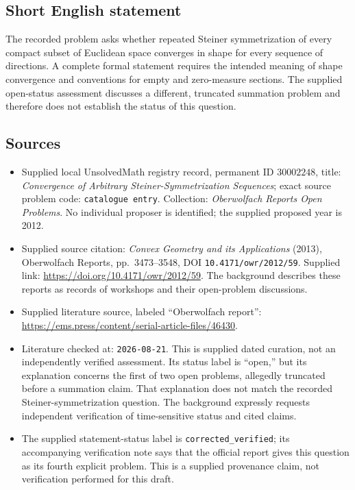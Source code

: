 \documentclass[11pt]{article}
\begin{document}
\subsection{Short English statement}
The recorded problem asks whether repeated Steiner symmetrization of every compact subset of Euclidean space converges in shape for every sequence of directions. A complete formal statement requires the intended meaning of shape convergence and conventions for empty and zero-measure sections. The supplied open-status assessment discusses a different, truncated summation problem and therefore does not establish the status of this question.
\subsection{Sources}
\begin{itemize}
\item Supplied local UnsolvedMath registry record, permanent ID \(30002248\), title: \emph{Convergence of Arbitrary Steiner-Symmetrization Sequences}; exact source problem code: \texttt{catalogue entry}. Collection: \emph{Oberwolfach Reports Open Problems}. No individual proposer is identified; the supplied proposed year is 2012.
\item Supplied source citation: \emph{Convex Geometry and its Applications} (2013), Oberwolfach Reports, pp.\ 3473--3548, DOI \texttt{10.4171/owr/2012/59}. Supplied link: \url{https://doi.org/10.4171/owr/2012/59}. The background describes these reports as records of workshops and their open-problem discussions.
\item Supplied literature source, labeled ``Oberwolfach report'': \url{https://ems.press/content/serial-article-files/46430}.
\item Literature checked at: \texttt{2026-08-21}. This is supplied dated curation, not an independently verified assessment. Its status label is ``open,'' but its explanation concerns the first of two open problems, allegedly truncated before a summation claim. That explanation does not match the recorded Steiner-symmetrization question. The background expressly requests independent verification of time-sensitive status and cited claims.
\item The supplied statement-status label is \texttt{corrected\_verified}; its accompanying verification note says that the official report gives this question as its fourth explicit problem. This is a supplied provenance claim, not verification performed for this draft.
\end{itemize}
\end{document}
